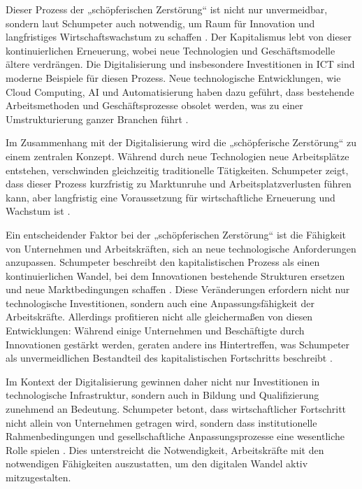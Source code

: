 Dieser Prozess der „schöpferischen Zerstörung“ ist nicht nur unvermeidbar, sondern laut 
Schumpeter auch notwendig, um Raum für Innovation und langfristiges Wirtschaftswachstum zu 
schaffen \parencite[vgl.][S. 83]{schumpeter1976capitalism}. Der Kapitalismus lebt von dieser 
kontinuierlichen Erneuerung, wobei neue Technologien und Geschäftsmodelle ältere verdrängen. 
Die Digitalisierung und insbesondere Investitionen in \ac{ICT} sind moderne Beispiele für 
diesen Prozess. Neue technologische Entwicklungen, wie Cloud Computing, \ac{AI} und 
Automatisierung haben dazu geführt, dass bestehende Arbeitsmethoden und Geschäftsprozesse 
obsolet werden, was zu einer Umstrukturierung ganzer Branchen führt 
\parencite[vgl.][S. 14–15]{frey2013thefuture}. 

Im Zusammenhang mit der Digitalisierung wird die „schöpferische Zerstörung“ zu einem zentralen 
Konzept. Während durch neue Technologien neue Arbeitsplätze entstehen, verschwinden gleichzeitig 
traditionelle Tätigkeiten. Schumpeter zeigt, dass dieser Prozess kurzfristig zu Marktunruhe und 
Arbeitsplatzverlusten führen kann, aber langfristig eine Voraussetzung für wirtschaftliche 
Erneuerung und Wachstum ist \parencite[vgl.][S. 151–154]{schumpeter1976capitalism}. 

Ein entscheidender Faktor bei der „schöpferischen Zerstörung“ ist die Fähigkeit von Unternehmen 
und Arbeitskräften, sich an neue technologische Anforderungen anzupassen. Schumpeter beschreibt 
den kapitalistischen Prozess als einen kontinuierlichen Wandel, bei dem Innovationen bestehende 
Strukturen ersetzen und neue Marktbedingungen schaffen 
\parencite[vgl.][S. 83–84]{schumpeter1976capitalism}. Diese Veränderungen erfordern nicht nur 
technologische Investitionen, sondern auch eine Anpassungsfähigkeit der Arbeitskräfte. Allerdings 
profitieren nicht alle gleichermaßen von diesen Entwicklungen: Während einige Unternehmen und 
Beschäftigte durch Innovationen gestärkt werden, geraten andere ins Hintertreffen, was Schumpeter 
als unvermeidlichen Bestandteil des kapitalistischen Fortschritts beschreibt 
\parencite[vgl.][S. 84–85]{schumpeter1976capitalism}. 

Im Kontext der Digitalisierung gewinnen daher nicht nur Investitionen in technologische 
Infrastruktur, sondern auch in Bildung und Qualifizierung zunehmend an Bedeutung. Schumpeter 
betont, dass wirtschaftlicher Fortschritt nicht allein von Unternehmen getragen wird, sondern 
dass institutionelle Rahmenbedingungen und gesellschaftliche Anpassungsprozesse eine wesentliche 
Rolle spielen \parencite[vgl.][S. 132–133]{schumpeter1976capitalism}. Dies unterstreicht die 
Notwendigkeit, Arbeitskräfte mit den notwendigen Fähigkeiten auszustatten, um den digitalen 
Wandel aktiv mitzugestalten.  


